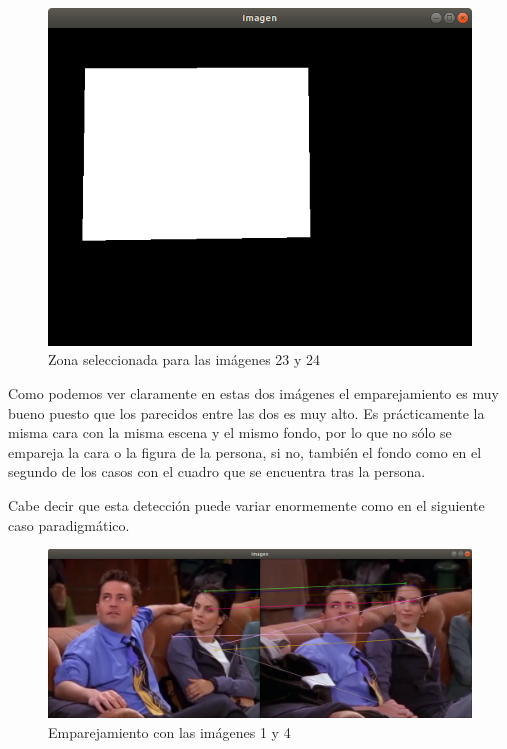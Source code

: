 \documentclass[12pt,a4paper]{article}
\begin{document}
\begin{figure}[H]
	\centering
	\includegraphics[scale=0.3]{./Imagenes/Ejercicio1-mascara2.png}
	\caption{Zona seleccionada para las imágenes 23 y 24}
\end{figure}

Como podemos ver claramente en estas dos imágenes el emparejamiento es muy bueno puesto que los parecidos entre las dos es muy alto. Es prácticamente la misma cara con la misma escena y el mismo fondo, por lo que no sólo se empareja la cara o la figura de la persona, si no, también el fondo como en el segundo de los casos con el cuadro que se encuentra tras la persona.

\vspace{10px}

Cabe decir que esta detección puede variar enormemente como en el siguiente caso paradigmático.

\begin{figure}[H]
  \centering
  \includegraphics[scale=0.35]{./Imagenes/Ejercicio1-3.png}
  \caption{Emparejamiento con las imágenes 1 y 4}
\end{figure}
\end{document}
